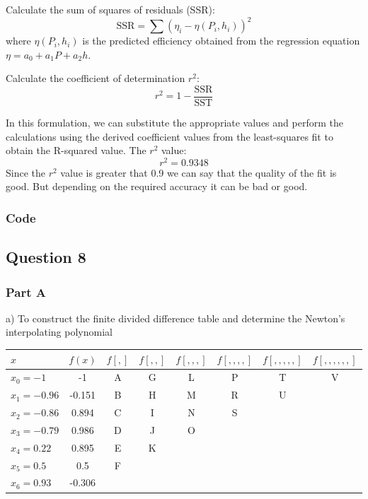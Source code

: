 \documentclass[12pt, a4paper]{article}
\numberwithin{equation}{section}
\begin{document}
Calculate the sum of squares of residuals (SSR):
\begin{equation}
    \text{SSR} = \sum (\eta_i - \eta(P_i, h_i))^2
\end{equation}
where $ \eta (P_i, h_i)$ is the predicted efficiency obtained from the regression equation $\eta = a_0 + a_1P + a_2h$.

Calculate the coefficient of determination $r^2$:
\begin{equation}
r^2 = 1 - \frac{\text{SSR}}{\text{SST}}
\end{equation}

In this formulation, we can substitute the appropriate values and perform the calculations using the derived coefficient values from the least-squares fit to obtain the R-squared value.
The $r^2$ value:
$$ r^2 = 0.9348$$
Since the $r^2$ value is greater that 0.9 we can say that the quality of the fit is good. But depending on the required accuracy it can be bad or good. 

\newpage
\subsubsection{Code}


\newpage

\subsection{Question 8}
\subsubsection{Part A}

a) To construct the finite divided difference table and determine the Newton's interpolating polynomial


\begin{table}[!ht]
    \centering
    \begin{tabular}{lccccccc}
    \hline
        $x$ & $f(x)$ & $f [ , ]$ & $f [ , ,]$ & $f [ , , ,]$ & $f [ , , , ,]$ & $f [ , , , , ,]$ & $f [ , , , , , ,]$ \\ \hline
        $x_0 = -1$ & -1 & A & G & L & P & T & V \\ 
        $x_1 = -0.96$ & -0.151 & B & H & M & R & U & \\ 
        $x_2 = -0.86$ & 0.894 & C & I & N & S & & \\ 
        $x_3 = -0.79$ & 0.986 & D & J & O & & & \\ 
        $x_4 = 0.22$ & 0.895 & E & K & & & & \\ 
        $x_5 = 0.5$ & 0.5 & F & & & & &  \\ 
        $x_6 = 0.93$ & -0.306 & & & & & & \\ \hline
    \end{tabular}
\end{table}
\end{document}
